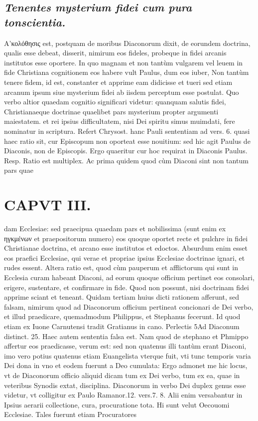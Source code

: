 \documentclass{article}
\begin{document}
\begin{pages}
\subsection*{\textit{ Tenentes mysterium fidei cum pura tonscientia. }}\pstart Α'κολόθησις est, postquam de moribus Diaconorum dixit, de eorundem doctrina, qualis esse debeat, disserit, nimirum eos fideles, probeque in fidei arcanis institutos esse oportere. In quo magnam et non tantùm vulgarem vel leuem in fide Christiana cognitionem eos habere vult Paulus, dum eos iuber, Non tantùm tenere fidem, id est, constanter et apprime eam didicisse et tueri sed etiam arcanum ipsum siue mysterium fidei ab iisdem perceptum esse postulat. Quo verbo altior quaedam cognitio significari videtur: quanquam salutis fidei, Christianaeque doctrinae quaelibet pars mysterium propter argumenti maiestatem. et rei ipsius difficultatem, nisi Dei spiritu simus muimdati, fere nominatur in scriptura. Refert Chrysost. hanc Pauli sententiam ad vers. 6. quasi haec ratio sit, cur Episcopum non oporteat esse nouitium: sed hic agit Paulus de Diaconis, non de Episcopis.  \pend\pstart Ergo quaeritur cur hoc requirat in Diaconis Paulus. Resp. Ratio est multiplex. Ac prima quidem quod cùm Diaconi sint non tantum pars quae\pend
\section*{CAPVT   III. }
\marginpar{[ p.161 ]}\pstart dam Ecclesiae: sed praecipua quaedam pars et nobilissima (sunt enim ex ηγκμένων et praepositorum numero) eos quoque oportet recte et pulchre in fidei Christianae doctrina, et arcano esse institutos et edoctos. Absurdum enim esset eos praefici Ecclesiae, qui verae et propriae ipsius Ecclesiae doctrinae ignari, et rudes essent. Altera ratio est, quod cùm pauperum et afflictorum qui sunt in Ecclesia curam habeant Diaconi, ad eorum quoque officium pertinet eos consolari, erigere, sustentare, et confirmare in fide. Quod non possunt, nisi doctrinam fidei apprime sciant et teneant. Quidam tertiam huius dicti rationem afferunt, sed falsam, nimirum quod ad Diaconorum officium pertineat concionari de Dei verbo, et illud praedicare, quemadmodum Philippus, et Stephanus fecerunt. Id quod etiam ex Iuone Carnutensi tradit Gratianus in cano. Perlectis 5Ad Diaconum distinct. 25. Haec autem sententia falsa est. Nam quod de stephano et Phmippo affertur eos praedicasse, verum est: sed non quatenus illi tantùm erant Diaconi, imo vero potius quatenus etiam Euangelista vterque fuit, vti tunc temporis varia Dei dona in vno et eodem fuerunt a Deo cumulata:  \pend\pstart Ergo admonet me hic locus, vt de Diaconorum officio aliquid dicam tum ex Dei verbo, tum ex ea, quae in veteribus Synodis extat, disciplina. Diaconorum in verbo Dei duplex genus esse videtur, vt colligitur ex Paulo Ramanor.12. vers.7. 8. Alii enim versabantur in Ipsius aerarii collectione, cura, procuratione tota. Hi sunt velut Oecouomi Ecclesiae. Tales fuerunt etiam Procuratores  \pend

\end{pages}
\end{document}
